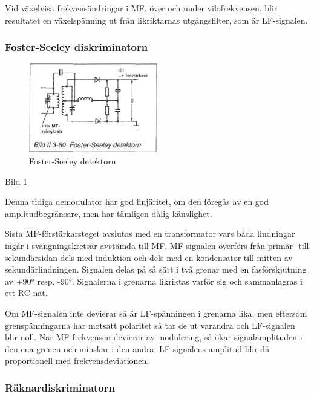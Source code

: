 Vid växelvisa frekvensändringar i MF, över och under vilofrekvensen,
blir resultatet en växelspänning ut från likriktarnas utgångsfilter,
som är LF-signalen.

\subsubsection{Foster-Seeley diskriminatorn}

\begin{figure}
\includegraphics[width=0.5\textwidth]{images/bild_2_3-60}
\caption{Foster-Seeley detektorn}
\label{fig:BildII3-60}
\end{figure}

Bild \ref{fig:BildII3-60}

Denna tidiga demodulator har god linjäritet, om den föregås av en god
amplitudbegränsare, men har tämligen dålig känslighet.

Sista MF-förstärkarsteget avslutas med en transformator vars båda
lindningar ingår i svängningskretsar avstämda till MF. MF-signalen
överförs från primär- till sekundärsidan dels med induktion och dels
med en kondensator till mitten av sekundärlindningen. Signalen delas på
så sätt i två grenar med en fasförskjutning av +90° resp. -90°.
Signalerna i grenarna likriktas varför sig och sammanlagras i ett
RC-nät.

Om MF-signalen inte devierar så är LF-spänningen i grenarna lika, men
eftersom grenspänningarna har motsatt polaritet så tar de ut varandra
och LF-signalen blir noll.  När MF-frekvensen devierar av modulering,
så ökar signalamplituden i den ena grenen och minskar i den
andra. LF-signalens amplitud blir då proportionell med
frekvensdeviationen.

\subsubsection{Räknardiskriminatorn}

